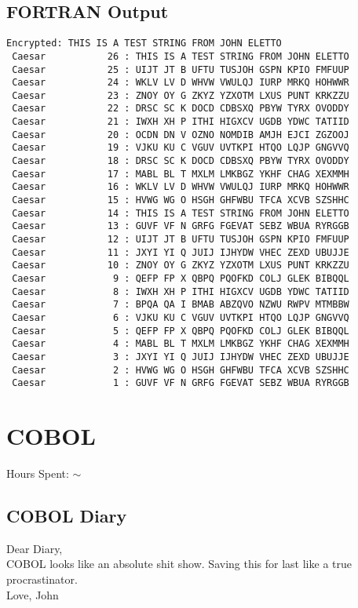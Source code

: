 \documentclass{report}
\begin{document}
\subsection*{FORTRAN Output}
\begin{lstlisting}
Encrypted: THIS IS A TEST STRING FROM JOHN ELETTO
 Caesar           26 : THIS IS A TEST STRING FROM JOHN ELETTO
 Caesar           25 : UIJT JT B UFTU TUSJOH GSPN KPIO FMFUUP
 Caesar           24 : WKLV LV D WHVW VWULQJ IURP MRKQ HOHWWR
 Caesar           23 : ZNOY OY G ZKYZ YZXOTM LXUS PUNT KRKZZU
 Caesar           22 : DRSC SC K DOCD CDBSXQ PBYW TYRX OVODDY
 Caesar           21 : IWXH XH P ITHI HIGXCV UGDB YDWC TATIID
 Caesar           20 : OCDN DN V OZNO NOMDIB AMJH EJCI ZGZOOJ
 Caesar           19 : VJKU KU C VGUV UVTKPI HTQO LQJP GNGVVQ
 Caesar           18 : DRSC SC K DOCD CDBSXQ PBYW TYRX OVODDY
 Caesar           17 : MABL BL T MXLM LMKBGZ YKHF CHAG XEXMMH
 Caesar           16 : WKLV LV D WHVW VWULQJ IURP MRKQ HOHWWR
 Caesar           15 : HVWG WG O HSGH GHFWBU TFCA XCVB SZSHHC
 Caesar           14 : THIS IS A TEST STRING FROM JOHN ELETTO
 Caesar           13 : GUVF VF N GRFG FGEVAT SEBZ WBUA RYRGGB
 Caesar           12 : UIJT JT B UFTU TUSJOH GSPN KPIO FMFUUP
 Caesar           11 : JXYI YI Q JUIJ IJHYDW VHEC ZEXD UBUJJE
 Caesar           10 : ZNOY OY G ZKYZ YZXOTM LXUS PUNT KRKZZU
 Caesar            9 : QEFP FP X QBPQ PQOFKD COLJ GLEK BIBQQL
 Caesar            8 : IWXH XH P ITHI HIGXCV UGDB YDWC TATIID
 Caesar            7 : BPQA QA I BMAB ABZQVO NZWU RWPV MTMBBW
 Caesar            6 : VJKU KU C VGUV UVTKPI HTQO LQJP GNGVVQ
 Caesar            5 : QEFP FP X QBPQ PQOFKD COLJ GLEK BIBQQL
 Caesar            4 : MABL BL T MXLM LMKBGZ YKHF CHAG XEXMMH
 Caesar            3 : JXYI YI Q JUIJ IJHYDW VHEC ZEXD UBUJJE
 Caesar            2 : HVWG WG O HSGH GHFWBU TFCA XCVB SZSHHC
 Caesar            1 : GUVF VF N GRFG FGEVAT SEBZ WBUA RYRGGB
\end{lstlisting}

\section*{COBOL}
Hours Spent: $\sim$
\subsection*{COBOL Diary}
Dear Diary,
\\
COBOL looks like an absolute shit show. Saving this for last like a true procrastinator.
\\
Love, John
\end{document}
